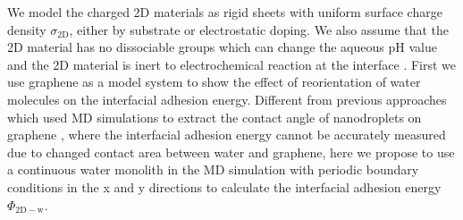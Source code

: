 \documentclass[journal=ancac3,manuscript=article,email=true]{achemso}
\begin{document}
We model the charged 2D materials as rigid sheets with uniform surface
charge density \(\sigma_{\mathrm{2D}}\), either by substrate or
electrostatic doping. We also assume that the 2D material has no
dissociable groups which can change the aqueous pH value
\cite{zuccaro_tuning_2015} and the 2D material is inert to
electrochemical reaction at the interface
\cite{bard_electrochemical_1980}.  First we use graphene as a model
system to show the effect of reorientation of water molecules on the
interfacial adhesion energy. Different from previous approaches which
used MD simulations to extract the contact angle of nanodroplets on
graphene
\cite{ostrowski_tunable_2014,daub_electrowetting_2007,ren_interfacial_2015,Taherian_2015},
where the interfacial adhesion energy cannot be accurately measured
due to changed contact area between water and graphene, here we
propose to use a continuous water monolith in the MD simulation with periodic boundary conditions in the x and y directions to
calculate the interfacial adhesion energy \(\Phi_{\mathrm{2D-w}}\).
\begin{center}
\end{center}
\end{document}
